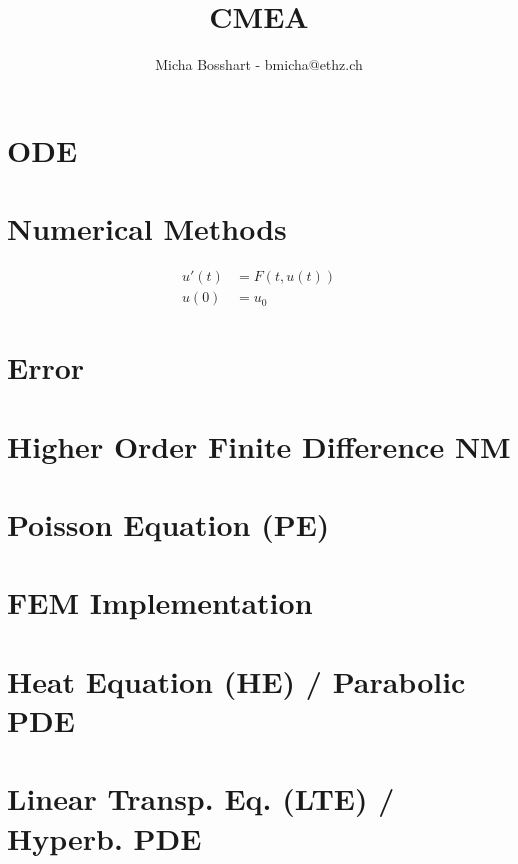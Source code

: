 \documentclass[8pt]{mpscheatsheet}
\author{Micha Bosshart - bmicha@ethz.ch}
\title{CMEA}
\newcommand{\densify}[1]{}
\begin{document}
    \section{ODE}
        
        
        
    \section{Numerical Methods}
        \vspace{-1em}\begin{align*}u'(t) &=F(t,u(t))\\u(0) &= u_0\end{align*}
        
        
        
        
        \vfill \null \columnbreak
    \section{Error}
        
        
        
    \section{Higher Order Finite Difference NM}
        
        
        
    \section{Poisson Equation (PE)}
        
        
        
        
        
    \section{FEM Implementation}
        
        
        
        
    \section{Heat Equation (HE) / Parabolic PDE}
        
        
        
        
        
        
        
    \newpage
    \section{Linear Transp. Eq. (LTE) / Hyperb. PDE}
        
        
        
        


    \densify{
    \section{Stability}
        
    }
   
\end{document}
